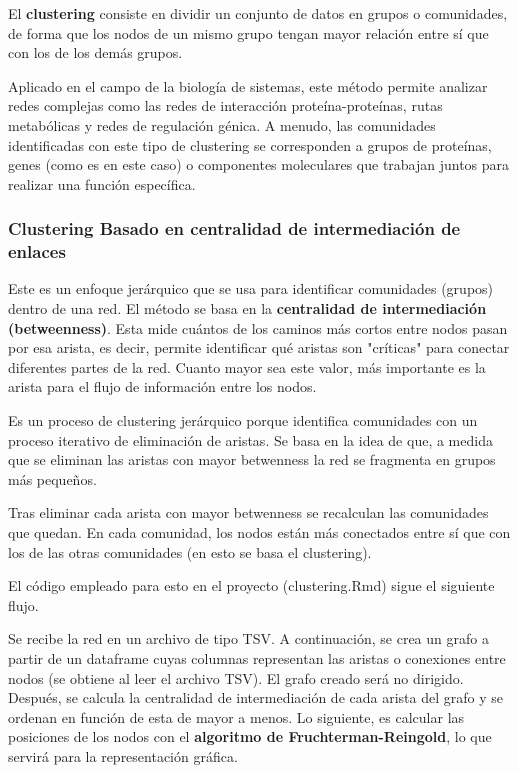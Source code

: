 El \textbf{clustering} consiste en dividir un conjunto de datos en grupos o comunidades, de forma que los nodos de un mismo grupo tengan mayor relación entre sí que con los de los demás grupos.

Aplicado en el campo de la biología de sistemas, este método permite analizar redes complejas como las redes de interacción proteína-proteínas, rutas metabólicas y redes de regulación génica. A menudo, las comunidades identificadas con este tipo de clustering se corresponden a grupos de proteínas, genes (como es en este caso) o componentes moleculares que trabajan juntos para realizar una función específica.

\subsubsection{Clustering Basado en centralidad de intermediación de enlaces}

Este es un enfoque jerárquico que se usa para identificar comunidades (grupos) dentro de una red. El método se basa en la \textbf{centralidad de intermediación (betweenness)}. Esta mide cuántos de los caminos más cortos entre nodos pasan por esa arista, es decir, permite identificar qué aristas son "críticas" para conectar diferentes partes de la red. Cuanto mayor sea este valor, más importante es la arista para el flujo de información entre los nodos.

Es un proceso de clustering jerárquico porque identifica comunidades con un proceso iterativo de eliminación de aristas. Se basa en la idea de que, a medida que se eliminan las aristas con mayor betwenness la red se fragmenta en grupos más pequeños.

Tras eliminar cada arista con mayor betwenness se recalculan las comunidades que quedan. En cada comunidad, los nodos están más conectados entre sí que con los de las otras comunidades (en esto se basa el clustering).

El código empleado para esto en el proyecto (clustering.Rmd) sigue el siguiente flujo.

Se recibe la red en un archivo de tipo TSV. A continuación, se crea un grafo a partir de un dataframe cuyas columnas representan las aristas o conexiones entre nodos (se obtiene al leer el archivo TSV). El grafo creado será no dirigido. Después, se calcula la centralidad de intermediación de cada arista del grafo y se ordenan en función de esta de mayor a menos. Lo siguiente, es calcular las posiciones de los nodos con el \textbf{algoritmo de Fruchterman-Reingold}, lo que servirá para la representación gráfica.

